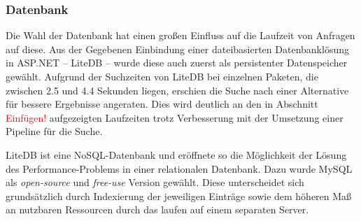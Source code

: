 \subsubsection{Datenbank} \label{sec:ExperimenteDB}
Die Wahl der Datenbank hat einen großen Einfluss auf die Laufzeit von Anfragen auf diese.
Aus der Gegebenen Einbindung einer dateibasierten Datenbanklösung in ASP.NET -- LiteDB -- wurde diese auch zuerst als persistenter Datenspeicher gewählt.
Aufgrund der Suchzeiten von LiteDB bei einzelnen Paketen, die zwischen 2.5 und 4.4 Sekunden liegen, erschien die Suche nach einer Alternative für bessere Ergebnisse angeraten.
Dies wird deutlich an den in Abschnitt \textcolor{red}{Einfügen!} aufgezeigten Laufzeiten trotz Verbesserung mit der Umsetzung einer Pipeline für die Suche.

LiteDB ist eine NoSQL-Datenbank und eröffnete so die Möglichkeit der Lösung des Performance-Problems in einer relationalen Datenbank.
Dazu wurde MySQL als \textit{open-source} und \textit{free-use} Version gewählt.
Diese unterscheidet sich grundsätzlich durch Indexierung der jeweiligen Einträge sowie dem höheren Maß an nutzbaren Ressourcen durch das laufen auf einem separaten Server.


